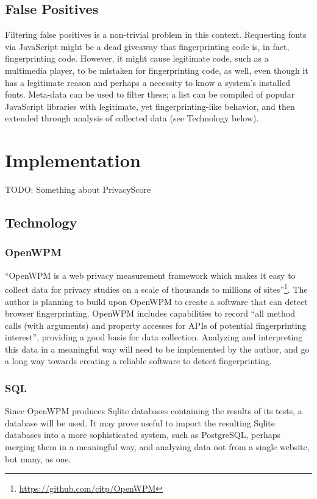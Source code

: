 \documentclass[
    fontsize=12pt,
    headings=small,
    parskip=half,
    bibliography=totoc,
    numbers=noenddot,
    open=any
    ]{scrreprt}
\begin{document}
\section{False Positives}
Filtering false positives is a non-trivial problem in this context. Requesting fonts via JavaScript might be a dead giveaway
that fingerprinting code is, in fact, fingerprinting code. However, it might cause legitimate code, such
as a multimedia player, to be mistaken for fingerprinting code, as well, even though it has a legitimate
reason and perhaps a necessity to know a system's installed fonts.
Meta-data can be used to filter these; a list can be compiled of popular JavaScript libraries with legitimate,
yet fingerprinting-like behavior, and then extended through analysis of collected data (see Technology below).


\begingroup
\renewcommand{\cleardoublepage}{}
\renewcommand{\clearpage}{}
\chapter{Implementation} %
\endgroup
TODO: Something about PrivacyScore

\section{Technology}

\subsection{OpenWPM}
``OpenWPM is a web privacy measurement framework which makes it easy to collect data for privacy studies on a scale
of thousands to millions of sites''\footnote{\url{https://github.com/citp/OpenWPM}}.
The author is planning to build upon OpenWPM \cite{DBLP:conf/ccs/EnglehardtN16} to create a software that can detect
browser fingerprinting. OpenWPM includes capabilities to record
``all method calls (with arguments) and property accesses for APIs of potential fingerprinting interest'',
providing a good basis for data collection. Analyzing and interpreting this data in a meaningful way
will need to be implemented by the author, and go a long way towards creating a reliable software
to detect fingerprinting.

\subsection{SQL}
Since OpenWPM produces Sqlite databases containing the results of its tests, a database will be used. It may prove useful
to import the resulting Sqlite databases into a more sophisticated system, such as PostgreSQL, perhaps merging them in a
meaningful way, and analyzing data not from a single website, but many, as one.
\end{document}
